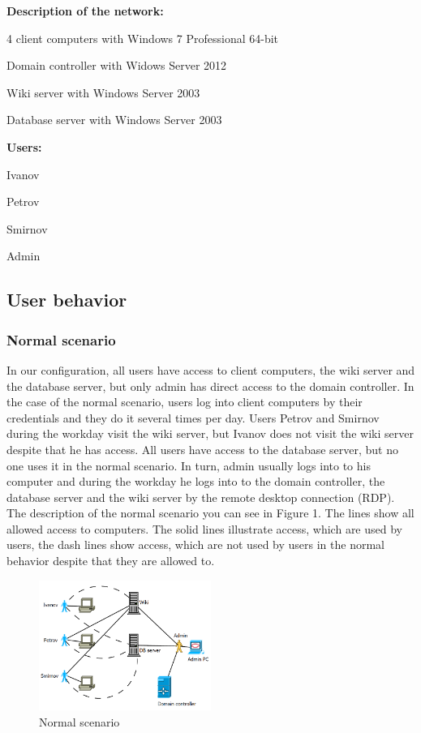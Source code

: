 \begin{compactitem}
\item [\textbf{Description of the network:}]
\item 4 client computers with Windows 7 Professional 64-bit
\item Domain controller with Widows Server 2012
\item Wiki server with Windows Server 2003
\item Database server with Windows Server 2003
\end{compactitem}

\begin{compactitem}
\item [\textbf{Users:}]
\item Ivanov
\item Petrov
\item Smirnov
\item Admin
\end{compactitem}
     
     
\subsection{User behavior}
\subsubsection{Normal scenario}
In our configuration, all users have access to client computers, the wiki server and the database server, but only admin has direct access to the domain controller. In the case of the normal scenario, users log into client computers by their credentials and they do it several times per day. Users Petrov and Smirnov during the workday visit the wiki server, but Ivanov does not visit the wiki server despite that he has access. All users have access to the database server, but no one uses it in the normal scenario. In turn, admin usually logs into to his computer and during the workday he logs into to the domain controller, the database server and the wiki server by the remote desktop connection (RDP). The description of the normal scenario you can see in Figure 1. The lines show all allowed access to computers. The solid lines illustrate access, which are used by users, the dash lines show access, which are not used by users in the normal behavior despite that they are allowed to. 

\begin{figure}[ht!]
\centering
\includegraphics[width=0.5\textwidth]{figures/scenario_normal.png}
\caption{Normal scenario}
\label{overflow}
\end{figure}

